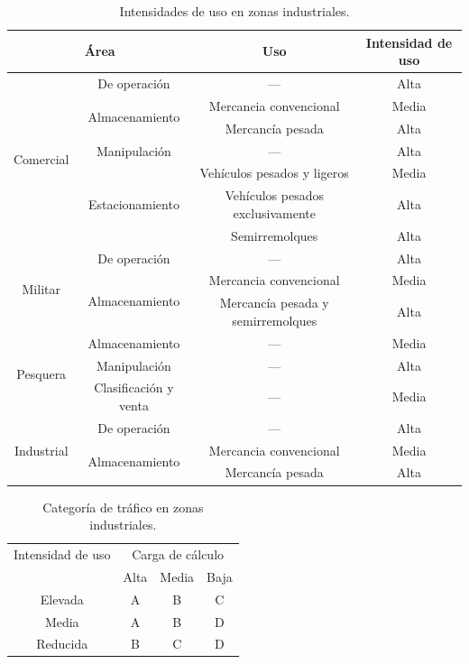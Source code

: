\begin{table}[!htb]
\centering
\begin{tabular}{cccc}
\toprule
\multicolumn{2}{c}{Área} & Uso & Intensidad de uso\\
\midrule
\multirow{7}{*}{Comercial} & De operación & — & Alta\\
& \multirow{2}{*}{Almacenamiento} & Mercancia convencional & Media\\
& & Mercancía pesada & Alta\\
& Manipulación & — & Alta\\
& \multirow{3}{*}{Estacionamiento} & Vehículos pesados y ligeros & Media\\
& & Vehículos pesados exclusivamente & Alta\\
& & Semirremolques & Alta\\
\midrule
\multirow{3}{*}{Militar} & De operación & — & Alta\\
& \multirow{2}{*}{Almacenamiento} & Mercancia convencional & Media\\
& & Mercancía pesada y semirremolques & Alta\\
\midrule
\multirow{3}{*}{Pesquera} & Almacenamiento & — & Media\\
& Manipulación & — & Alta\\
& Clasificación y venta & — & Media\\
\midrule
\multirow{3}{*}{Industrial} & De operación & — & Alta\\
& \multirow{2}{*}{Almacenamiento} & Mercancia convencional & Media\\
& & Mercancía pesada & Alta\\
\bottomrule
\end{tabular}
\caption{Intensidades de uso en zonas industriales.}
\label{categoriadetraficoenzonasindustrialesintensidades}
\end{table}


\begin{table}[!htb]
\centering
\begin{tabular}{cccc}
\toprule
Intensidad de uso & \multicolumn{3}{c}{Carga de cálculo}\\
\cmidrule{2-4}
& Alta & Media & Baja\\
\midrule
Elevada & A & B & C\\
Media & A & B & D\\
Reducida & B & C & D\\
\bottomrule
\end{tabular}
\caption{Categoría de tráfico en zonas industriales.}
\label{categoriadetraficoenzonasindustriales}
\end{table}

